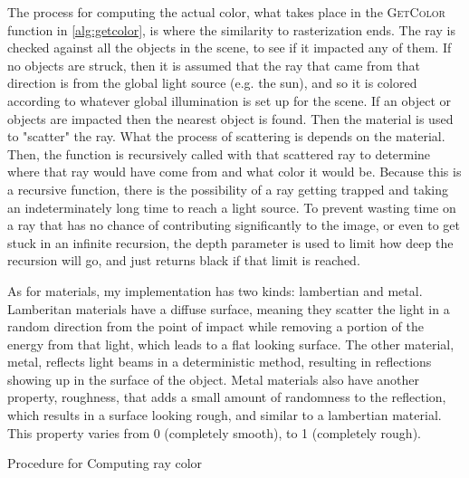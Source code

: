 \documentclass[10pt]{IEEEtran}
\begin{document}
The process for computing the actual color, what takes place in the \textsc{GetColor} function in
\cref{alg:getcolor}, is where the similarity to rasterization ends. The ray is checked against all
the objects in the scene, to see if it impacted any of them. If no objects are struck, then it is
assumed that the ray that came from that direction is from the global light source (e.g. the sun),
and so it is colored according to whatever global illumination is set up for the scene. If an object
or objects are impacted then the nearest object is found. Then the material is used to "scatter" the
ray. What the process of scattering is depends on the material. Then, the function is recursively
called with that scattered ray to determine where that ray would have come from and what color it
would be. Because this is a recursive function, there is the possibility of a ray getting trapped
and taking an indeterminately long time to reach a light source. To prevent wasting time on a ray
that has no chance of contributing significantly to the image, or even to get stuck in an infinite
recursion, the depth parameter is used to limit how deep the recursion will go, and just returns
black if that limit is reached.

As for materials, my implementation has two kinds: lambertian and metal. Lamberitan materials have a
diffuse surface, meaning they scatter the light in a random direction from the point of impact while
removing a portion of the energy from that light, which leads to a flat looking surface. The other
material, metal, reflects light beams in a deterministic method, resulting in reflections showing up
in the surface of the object. Metal materials also have another property, roughness, that adds a
small amount of randomness to the reflection, which results in a surface looking rough, and similar
to a lambertian material. This property varies from 0 (completely smooth), to 1 (completely rough).

\begin{algorithm}[b]
    \caption{Procedure for Computing ray color}\label{alg:getcolor}
    \scriptsize
\end{algorithm}
\end{document}
